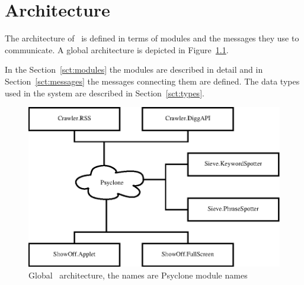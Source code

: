 \chapter{\label{cpt:architecture}Architecture}

The architecture of \Amber\ is defined in terms of modules and the messages
they use to communicate. A global architecture is depicted in
Figure~\ref{fig:global-architecture}.

In the Section~\ref{sct:modules} the modules are described in detail and in
Section~\ref{sct:messages} the messages connecting them are defined. The data
types used in the system are described in Section~\ref{sct:types}.

\begin{figure}
    \centering
    \includegraphics{image/global-architecture}
    \caption{\label{fig:global-architecture}Global \Amber\ architecture, the names are Psyclone module names}
\end{figure}







